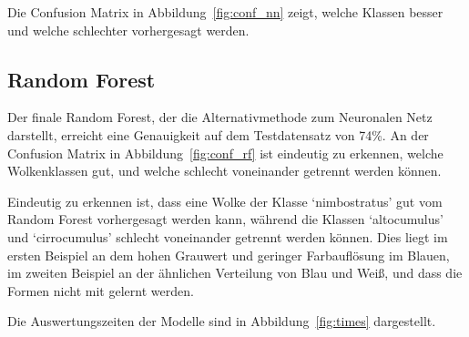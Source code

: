 Die Confusion Matrix in Abbildung~\ref{fig:conf_nn} zeigt, welche Klassen besser und
welche schlechter vorhergesagt werden.

\hypertarget{random-forest-1}{%
\subsection{Random Forest}\label{random-forest-1}}

Der finale Random Forest, der die Alternativmethode zum Neuronalen Netz
darstellt, erreicht eine Genauigkeit auf dem Testdatensatz von 74\%.
An der Confusion Matrix in Abbildung~\ref{fig:conf_rf} ist eindeutig zu erkennen, welche
Wolkenklassen gut, und welche schlecht voneinander getrennt werden
können.

Eindeutig zu erkennen ist, dass eine Wolke der Klasse `nimbostratus' gut
vom Random Forest vorhergesagt werden kann, während die Klassen
`altocumulus' und `cirrocumulus' schlecht voneinander getrennt werden
können. Dies liegt im ersten Beispiel an dem hohen Grauwert und geringer
Farbauflösung im Blauen, im zweiten Beispiel an der ähnlichen Verteilung
von Blau und Weiß, und dass die Formen nicht mit gelernt werden.


Die Auswertungszeiten der Modelle sind in Abbildung~\ref{fig:times} dargestellt.

